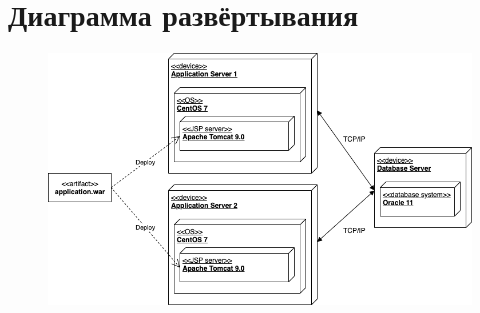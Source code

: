 \section{Диаграмма развёртывания}

\begin{figure}[H]
	\centering
	\includegraphics[width=0.9\linewidth]{img/deployment-uml}
\end{figure}
